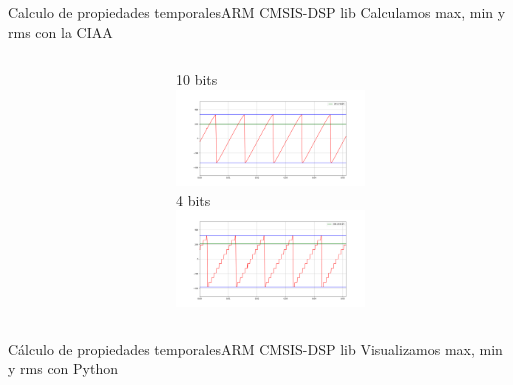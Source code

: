  \begin{frame}[t]{Calculo de propiedades temporales}{ARM CMSIS-DSP lib}
    \protoboardicon
    \footnotesize{Calculamos max, min y rms con la CIAA}
       \begin{columns}[t]
          \begin{column}[t]{.5\textwidth}
             
          \end{column}
          \begin{column}[t]{.5\textwidth}
                \tiny{10 bits}\\
                   \includegraphics[width=5cm]{2_clase/max_min_rms_10b.png}\\
                \tiny{4 bits}\\
                   \includegraphics[width=5cm]{2_clase/max_min_rms_4b.png} \\
          \end{column}
       \end{columns}
 \end{frame}
 \begin{frame}[t]{Cálculo de propiedades temporales}{ARM CMSIS-DSP lib}
    \handsonicon
    \footnotesize{Visualizamos max, min y rms con Python}
       \begin{columns}[t]
          \hspace{2pt}
          \begin{column}[t]{.4\textwidth}
             
          \end{column}
          \hspace{5pt}
          \vrule
          \hspace{5pt}
          \begin{column}[t]{.6\textwidth}
             
          \end{column}
       \end{columns}
 \end{frame}
